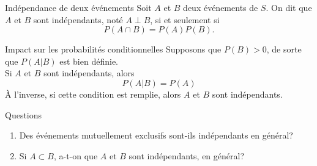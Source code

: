 \documentclass{BeamerTemplate}
\begin{document}

\begin{frame}[t]%
 \begin{Boite}{Indépendance de deux événements}
  Soit $A$ et $B$ deux événements de $S$. On dit que $A$ et $B$
  sont \alert{indépendants, noté $A\perp B$}, si et seulement si
  $$P(A\cap B) = P(A)P(B).$$
 \end{Boite}

    \begin{Boite}{Impact sur les probabilités conditionnelles}
   Supposons que $P(B)>0$, de sorte que $P(A|B)$ est bien définie.\\
   \alert{Si $A$ et $B$ sont indépendants}, alors
   $$P(A|B)=P(A)$$
   À l'inverse, si cette condition est remplie, alors $A$ et $B$ sont indépendants.
  \end{Boite}
\end{frame}

\begin{frame}[t]{Questions}
 \begin{enumerate}\itemsep 2cm
 \item   Des événements mutuellement exclusifs sont-ils  indépendants en général?
 \item Si $A\subset B$, a-t-on que $A$ et $B$ sont indépendants, en général?
\end{enumerate}
\end{frame}
\end{document}
